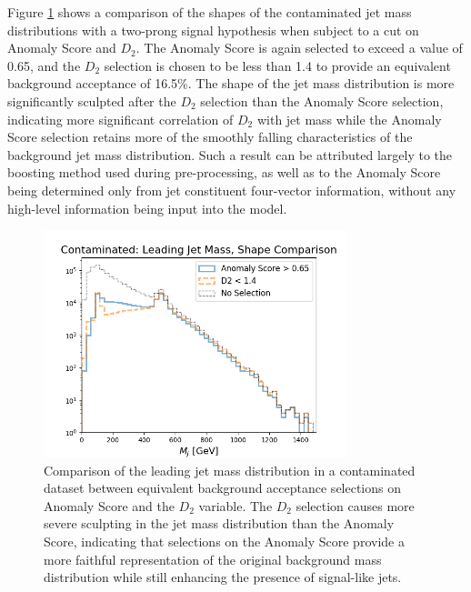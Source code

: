 \documentclass[12pt, a4paper]{article}
\begin{document}
Figure \ref{fig:d2_comp} shows a comparison of the shapes of the contaminated jet mass distributions with a two-prong signal hypothesis when subject to a cut on Anomaly Score and $D_2$. The Anomaly Score is again selected to exceed a value of 0.65, and the $D_2$ selection is chosen to be less than 1.4 to provide an equivalent background acceptance of 16.5\%. The shape of the jet mass distribution is more significantly sculpted after the $D_2$ selection than the Anomaly Score selection, indicating more significant correlation of $D_2$ with jet mass while the Anomaly Score selection retains more of the smoothly falling characteristics of the background jet mass distribution. Such a result can be attributed largely to the boosting method used during pre-processing, as well as to the Anomaly Score being determined only from jet constituent four-vector information, without any high-level information being input into the model. 

\begin{figure}[H]
	\begin{center}
		\includegraphics[width=250pt]{imgs/bugfix/2Prong_Contaminated_10p0_J_Mass_EventScore0p65_Multi_D2Comp_Lead_SaveForPaper.png}
	\end{center}
	\caption{Comparison of the leading jet mass distribution in a contaminated dataset between equivalent background acceptance selections on Anomaly Score and the $D_2$ variable. The $D_2$ selection causes more severe sculpting in the jet mass distribution than the Anomaly Score, indicating that selections on the Anomaly Score provide a more faithful representation of the original background mass distribution while still enhancing the presence of signal-like jets.}
	\label{fig:d2_comp}
\end{figure}
\end{document}

